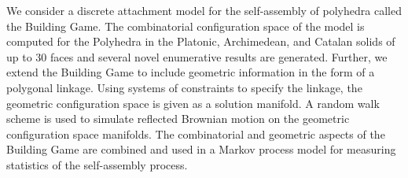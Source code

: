 
We consider a discrete attachment model for the self-assembly of polyhedra called the Building Game. The combinatorial configuration space of the model is computed for the Polyhedra in the Platonic, Archimedean, and Catalan solids of up to 30 faces and several novel enumerative results are generated. Further, we extend the Building Game to include geometric information in the form of a polygonal linkage. Using systems of constraints to specify the linkage, the geometric configuration space is given as a solution manifold. A random walk scheme is used to simulate reflected Brownian motion on the geometric configuration space manifolds. The combinatorial and geometric aspects of the Building Game are combined and used in a Markov process model for measuring statistics of the self-assembly process.
